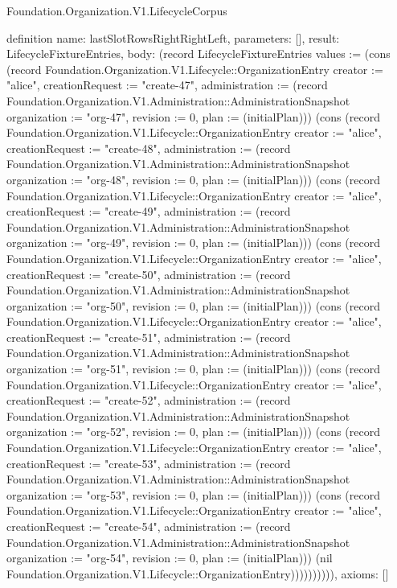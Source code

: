 \begin{lexlean}{Foundation.Organization.V1.LifecycleCorpus}
\begin{semanticmodule}
definition{
  name: lastSlotRowsRightRightLeft,
  parameters: [],
  result: LifecycleFixtureEntries,
  body: (record LifecycleFixtureEntries {values := (cons (record Foundation.Organization.V1.Lifecycle::OrganizationEntry {creator := "alice", creationRequest := "create-47", administration := (record Foundation.Organization.V1.Administration::AdministrationSnapshot {organization := "org-47", revision := 0, plan := (initialPlan)})}) (cons (record Foundation.Organization.V1.Lifecycle::OrganizationEntry {creator := "alice", creationRequest := "create-48", administration := (record Foundation.Organization.V1.Administration::AdministrationSnapshot {organization := "org-48", revision := 0, plan := (initialPlan)})}) (cons (record Foundation.Organization.V1.Lifecycle::OrganizationEntry {creator := "alice", creationRequest := "create-49", administration := (record Foundation.Organization.V1.Administration::AdministrationSnapshot {organization := "org-49", revision := 0, plan := (initialPlan)})}) (cons (record Foundation.Organization.V1.Lifecycle::OrganizationEntry {creator := "alice", creationRequest := "create-50", administration := (record Foundation.Organization.V1.Administration::AdministrationSnapshot {organization := "org-50", revision := 0, plan := (initialPlan)})}) (cons (record Foundation.Organization.V1.Lifecycle::OrganizationEntry {creator := "alice", creationRequest := "create-51", administration := (record Foundation.Organization.V1.Administration::AdministrationSnapshot {organization := "org-51", revision := 0, plan := (initialPlan)})}) (cons (record Foundation.Organization.V1.Lifecycle::OrganizationEntry {creator := "alice", creationRequest := "create-52", administration := (record Foundation.Organization.V1.Administration::AdministrationSnapshot {organization := "org-52", revision := 0, plan := (initialPlan)})}) (cons (record Foundation.Organization.V1.Lifecycle::OrganizationEntry {creator := "alice", creationRequest := "create-53", administration := (record Foundation.Organization.V1.Administration::AdministrationSnapshot {organization := "org-53", revision := 0, plan := (initialPlan)})}) (cons (record Foundation.Organization.V1.Lifecycle::OrganizationEntry {creator := "alice", creationRequest := "create-54", administration := (record Foundation.Organization.V1.Administration::AdministrationSnapshot {organization := "org-54", revision := 0, plan := (initialPlan)})}) (nil Foundation.Organization.V1.Lifecycle::OrganizationEntry)))))))))}),
  axioms: []
}


\end{semanticmodule}
\end{lexlean}
